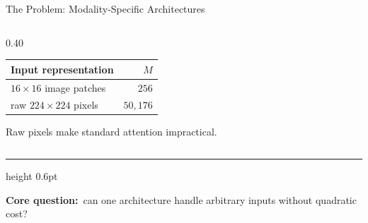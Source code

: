 \documentclass[aspectratio=169,11pt]{beamer}
\begin{document}
\begin{frame}[shrink=10]{The Problem: Modality-Specific Architectures}
\begin{columns}[T,onlytextwidth]
\begin{column}{0.40\textwidth}
      \vspace{0.35em}
      \begin{table}
        \centering\small
        \begin{tabular}{lr}
          \toprule
          \textbf{Input representation} & \textbf{$M$} \\
          \midrule
          $16\!\times\!16$ image patches & $256$ \\
          raw $224\!\times\!224$ pixels & $50{,}176$ \\
          \bottomrule
        \end{tabular}
      \end{table}

      \vspace{0.15em}
      \centering\small
      Raw pixels make standard attention \alert{impractical}.
    \end{column}
  \end{columns}

  \vspace{1.1em}
  {\color{UnifiBlue!25}\hrule height 0.6pt}
  \vspace{0.6em}
  \centering\small
  {\color{UnifiBlue}\textbf{Core question:}}\, can one architecture handle arbitrary inputs without quadratic cost?
\end{frame}

\newcommand{\SolutionCard}[3]{%
  \begin{beamercolorbox}[wd=\linewidth,rounded=true,shadow=true,sep=0pt]{solution card body}
    \begin{beamercolorbox}[wd=\linewidth,rounded=true,sep=0.06cm,leftskip=0.16cm]{solution card title}
      {\normalsize #1}
    \end{beamercolorbox}
    \vspace{0.10em}
    \hspace{0.16cm}\begin{minipage}[t][0.74cm][t]{0.88\linewidth}
      \raggedright
      \hyphenpenalty=10000\exhyphenpenalty=10000
      {\scriptsize\bfseries #2}\\[-0.10em]
      {\scriptsize #3}
    \end{minipage}
    \vspace{0.10em}
  \end{beamercolorbox}%
}
\end{document}
